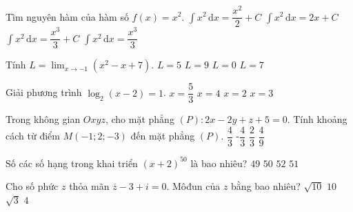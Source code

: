  \begin{ex}%
	Tìm nguyên hàm của hàm số $f(x)=x^2$.
	\choice
	{$\displaystyle\int x^2 \mathrm{\,d}x = \dfrac{x^2}{2}+C$ }
	{$\displaystyle\int x^2 \mathrm{\,d}x = 2x+C$ }
	{\True $\displaystyle\int x^2 \mathrm{\,d}x = \dfrac{x^3}{3}+C$ }
	{$\displaystyle\int x^2 \mathrm{\,d}x = \dfrac{x^3}{3}$ }
\end{ex}
 \begin{ex}%
	Tính $L=\displaystyle \lim_{x\to -1}(x^2-x+7)$.
	\choice
	{$L=5$}
	{\True $L=9$}
	{$L=0$}
	{$L=7$}
	
\end{ex}
 \begin{ex}%
	Giải phương trình $\log_2\left( x-2 \right) = 1$.
	\choice
	{$x=\dfrac{5}{3}$}
	{\True $x=4$}
	{$x=2$}
	{$x=3$}
\end{ex}
 \begin{ex}%
	Trong không gian $Oxyz$, cho mặt phẳng $(P) \colon  2x - 2y + z + 5 = 0$. Tính khoảng cách từ điểm $M(-1; 2; -3)$ đến mặt phẳng $(P)$.
	\choice
	{\True $\dfrac{4}{3}$}
	{-$\dfrac{4}{3}$}
	{$\dfrac{2}{3}$}
	{$\dfrac{4}{9}$}
\end{ex}
 \begin{ex}%
	Số các số hạng trong khai triển $\left(x +2 \right)^{50}$ là bao nhiêu?
	\choice
	{$49$}
	{$50$}
	{$52$}
	{\True $51$}
\end{ex}
 \begin{ex}%
	Cho số phức $z$ thỏa mãn $\overline{z} - 3 + i = 0$. Môđun của $z$ bằng bao nhiêu?
	\choice
	{\True $\sqrt{10}$}
	{$10$}
	{$\sqrt{3}$}
	{$4$}
\end{ex}
